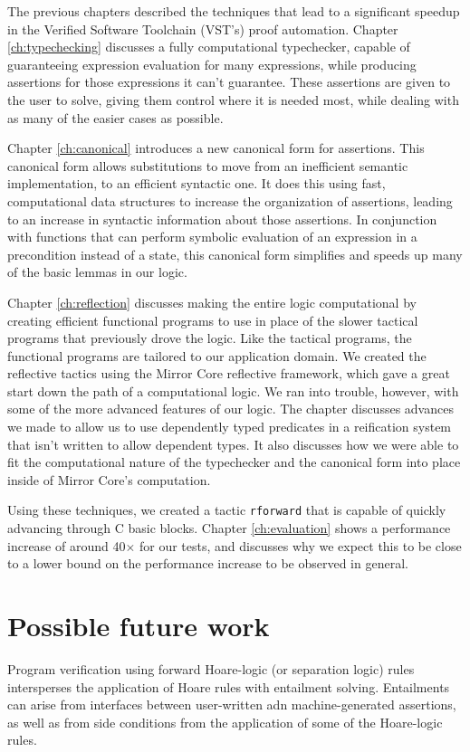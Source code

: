 \documentclass{puthesis}
\begin{document}
The previous chapters described the techniques that lead to a
significant speedup in the Verified Software Toolchain (VST's) proof
automation. Chapter \ref{ch:typechecking} discusses a fully
computational typechecker, capable of guaranteeing expression
evaluation for many expressions, while producing assertions for those
expressions it can't guarantee. These assertions are given to the
user to solve, giving them control where it is needed most,
while dealing with as many of the easier cases as possible. 

Chapter \ref{ch:canonical} introduces a new canonical form for
assertions. This canonical form allows substitutions to move from an
inefficient semantic implementation, to an efficient syntactic one. It
does this using fast, computational data structures to increase the
organization of assertions, leading to an increase in syntactic
information about those assertions. In conjunction with functions that
can perform symbolic evaluation of an expression in a precondition
instead of a state, this canonical form simplifies and speeds up many
of the basic lemmas in our logic.

Chapter \ref{ch:reflection} discusses making the entire logic
computational by creating efficient functional programs to use in
place of the slower tactical programs that previously drove the
logic. Like the tactical programs, the functional programs are
tailored to our application domain. We created the reflective tactics
using the Mirror Core reflective framework, which gave a great start
down the path of a computational logic. We ran into trouble, however,
with some of the more advanced features of our logic. The chapter
discusses advances we made to allow us to use dependently typed
predicates in a reification system that isn't written to allow
dependent types. It also discusses how we were able to fit the
computational nature of the typechecker and the canonical form into
place inside of Mirror Core's computation.

Using these techniques, we created a tactic \lstinline|rforward| that
is capable of quickly advancing through C basic blocks. Chapter
\ref{ch:evaluation} shows a performance increase of around 40$\times$
for our tests, and discusses why we expect this to be close to a lower
bound on the performance increase to be observed in general.

\section{Possible future work}
\label{sec:future}
Program verification using forward Hoare-logic (or separation logic)
rules intersperses the application of Hoare rules with entailment
solving. Entailments can arise from interfaces between user-written
adn machine-generated assertions, as well as from side conditions from
the application of some of the Hoare-logic rules.
\end{document}
